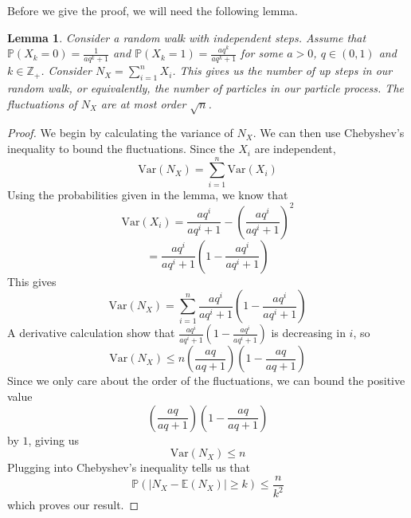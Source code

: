 \documentclass[12pt]{report}
\newtheorem{lem}[thm]{Lemma}
\theoremstyle{definition}
\begin{document}
Before we give the proof, we will need the following lemma.
\begin{lem}
Consider a random walk with independent steps.  Assume that $\mathbb{P}(X_k=0)=\frac{1}{aq^k+1}$ and $\mathbb{P}(X_k=1)=\frac{aq^k}{aq^k+1}$ for some $a>0$, $q\in (0,1)$ and $k\in\mathbb{Z}_{+}$.  Consider $N_X=\sum_{i=1}^n X_i$.  This gives us the number of up steps in our random walk, or equivalently, the number of particles in our particle process.  The fluctuations of $N_X$ are at most order $\sqrt{n}$.
\end{lem}
\begin{proof}
We begin by calculating the variance of $N_X$.  We can then use Chebyshev's inequality to bound the fluctuations.  Since the $X_i$ are independent, 
$$
\mathrm{Var}(N_X)=\sum_{i=1}^n \mathrm{Var}(X_i)
$$
Using the probabilities given in the lemma, we know that 
$$
\mathrm{Var}(X_i)=\frac{aq^i}{aq^i+1}-\left (\frac{aq^i}{aq^i+1}\right)^2
$$
$$
=\frac{aq^i}{aq^i+1}\left (1-\frac{aq^i}{aq^i+1}\right)
$$
This gives 
$$
\mathrm{Var}(N_X)=\sum_{i=1}^n\frac{aq^i}{aq^i+1}\left (1-\frac{aq^i}{aq^i+1}\right)
$$
A derivative calculation show that $\frac{aq^i}{aq^i+1}\left (1-\frac{aq^i}{aq^i+1}\right)$ is decreasing in $i$, so 
$$
\mathrm{Var}(N_X)\leq n \left(\frac{aq}{aq+1}\right)\left(1-\frac{aq}{aq+1}\right)
$$
Since we only care about the order of the fluctuations, we can bound the positive value
$$
\left(\frac{aq}{aq+1}\right)\left(1-\frac{aq}{aq+1}\right)
$$
by $1$, giving us 
$$
\mathrm{Var}(N_X)\leq n
$$
Plugging into Chebyshev's inequality tells us that 
$$\mathbb{P}\left(|N_X-\mathbb{E}(N_X)|\geq k\right)\leq \frac{n}{k^2}$$
which proves our result.  

\end{proof}
%
\end{document}
